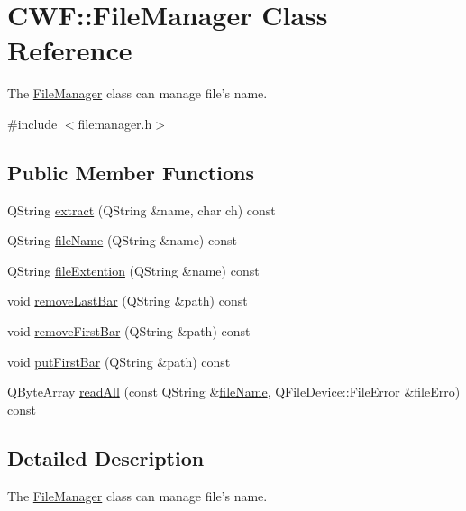 \hypertarget{class_c_w_f_1_1_file_manager}{\section{C\+W\+F\+:\+:File\+Manager Class Reference}
\label{class_c_w_f_1_1_file_manager}
}


The \hyperlink{class_c_w_f_1_1_file_manager}{File\+Manager} class can manage file's name.  




{\ttfamily \#include $<$filemanager.\+h$>$}

\subsection*{Public Member Functions}
\begin{DoxyCompactItemize}
\item 
Q\+String \hyperlink{class_c_w_f_1_1_file_manager_af431982f5da9772dc851a792ca42cf1d}{extract} (Q\+String \&name, char ch) const 
\item 
Q\+String \hyperlink{class_c_w_f_1_1_file_manager_a435ffe313b96261567da05806d38bacc}{file\+Name} (Q\+String \&name) const 
\item 
Q\+String \hyperlink{class_c_w_f_1_1_file_manager_a6b0dd898b161a1fb129aa7d488674b3a}{file\+Extention} (Q\+String \&name) const 
\item 
void \hyperlink{class_c_w_f_1_1_file_manager_a0b00584a292008515b686c67187bac13}{remove\+Last\+Bar} (Q\+String \&path) const 
\item 
void \hyperlink{class_c_w_f_1_1_file_manager_aa7918801a52bd8789239542b1c368889}{remove\+First\+Bar} (Q\+String \&path) const 
\item 
void \hyperlink{class_c_w_f_1_1_file_manager_af1c46c869cd3eece80c937556ecef9c8}{put\+First\+Bar} (Q\+String \&path) const 
\item 
Q\+Byte\+Array \hyperlink{class_c_w_f_1_1_file_manager_ad0e948a2e72ffa137027a3daa6055747}{read\+All} (const Q\+String \&\hyperlink{class_c_w_f_1_1_file_manager_a435ffe313b96261567da05806d38bacc}{file\+Name}, Q\+File\+Device\+::\+File\+Error \&file\+Erro) const 
\end{DoxyCompactItemize}


\subsection{Detailed Description}
The \hyperlink{class_c_w_f_1_1_file_manager}{File\+Manager} class can manage file's name. 

